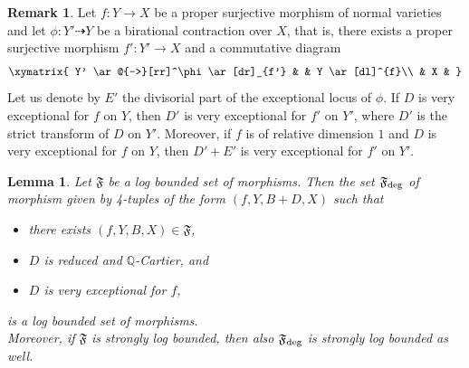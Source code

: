 \documentclass[11pt]{ip-journal}
\newtheorem{lemma}[theorem]{Lemma}
\theoremstyle{definition}
\newtheorem{remark}[theorem]{Remark}
\begin{document}
\begin{remark}
\label{q-fact.degen.rmk}
Let $f \colon Y \to X$ be a proper surjective morphism of normal varieties and let $\phi \colon Y' \dashrightarrow Y$ be a birational contraction over $X$, that is, there exists a proper surjective morphism $f' \colon Y' \to X$ and a commutative diagram
\begin{align*}
    \xymatrix{
    Y' \ar@{-->}[rr]^\phi \ar[dr]_{f'} &
    & Y \ar[dl]^{f}\\
    & X &
    }
\end{align*}
Let us denote by 
$E'$ 
the divisorial part of the exceptional locus of 
$\phi$.
If 
$D$ 
is very exceptional for 
$f$ 
on 
$Y$, then 
$D'$ 
is very exceptional for 
$f'$ 
on 
$Y'$, 
where 
$D'$ 
is the strict transform of 
$D$ 
on 
$Y'$. 
Moreover, if 
$f$ 
is of relative dimension 
$1$ 
and 
$D$ 
is 
very exceptional
for 
$f$ 
on 
$Y$, 
then 
$D'+E'$ 
is 
very exceptional
for 
$f'$ 
on 
$Y'$.
\end{remark}

\begin{lemma}
\label{degen.bound.lemma}
Let 
$\mathfrak F$ 
be a log bounded set of morphisms.
Then the set 
$\mathfrak{F}_{{\rm deg}}$ 
of morphism given by 4-tuples of the form 
$(f, Y, B+D, X)$  
such that
\begin{itemize}
    \item 
there exists 
$(f, Y, B, X) \in \mathfrak{F}$, 

    \item 
$D$ 
is reduced and 
$\mathbb{Q}$-Cartier, 
and
	
	\item 
$D$ 
is 
very exceptional for $f$,
\end{itemize} 
is a log bounded set of morphisms.
\\
Moreover, if 
$\mathfrak F$ 
is strongly log bounded, then also 
$\mathfrak{F}_{{\rm deg}}$ 
is strongly log bounded as well.
\end{lemma}
\end{document}
